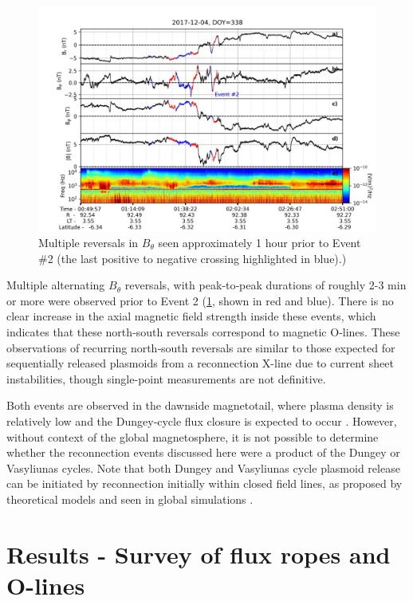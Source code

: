 \begin{figure}
    \centering
    \includegraphics[width=\textwidth]{images6/event-2-context.jpg}
    \caption{Multiple reversals in $B_\theta$ seen approximately 1 hour prior to Event \#2 (the last positive to negative crossing highlighted in blue).)}
    \label{fig:event-2-context}
\end{figure}

Multiple alternating $B_\theta$ reversals, with peak‐to‐peak durations of roughly 2-3 min or more were observed prior to Event 2 (\ref{fig:event-2-context}, shown in red and blue). There is no clear increase in the axial magnetic field strength inside these events, which indicates that these north‐south reversals correspond to magnetic O-lines. These observations of recurring north‐south reversals are similar to those expected for sequentially released plasmoids from a reconnection X-line due to current sheet instabilities, though single-point measurements are not definitive.

Both events are observed in the dawnside magnetotail, where plasma density is relatively low and the Dungey‐cycle flux closure is expected to occur \cite{Cowley2003b}. However, without context of the global magnetosphere, it is not possible to determine whether the reconnection events discussed here were a product of the Dungey or Vasyliunas cycles. Note that both Dungey and Vasyliunas cycle plasmoid release can be initiated by reconnection initially within closed field lines, as proposed by theoretical models \cite{Cowley2008} and seen in global simulations \cite{Sarkango2019}.

\section{Results - Survey of flux ropes and O-lines}

